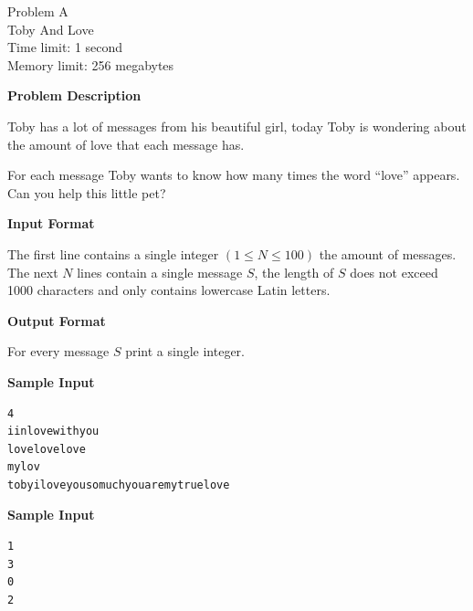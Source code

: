 \documentclass[11pt]{article}
\begin{document}
        \setcounter{page}{1}

        
        
        \begin{center}
            {\LARGE Problem A}\\
            {\Large Toby And Love}\\
            {Time limit: 1 second}\\
            {Memory limit: 256 megabytes}
        \end{center}\textbf{\large Problem Description}

Toby has a lot of messages from his beautiful girl, today Toby is wondering about
the amount of love that each message has.

For each message Toby wants to know how many times the word ``love'' appears.
Can you help this little pet?

\textbf{\large Input Format}

The first line contains a single integer $(1 \le N \le 100)$ the amount of messages.
The next $N$ lines contain a single message $S$, the length of $S$ does not exceed 1000 characters
and only contains lowercase Latin letters.

\textbf{\large Output Format}

For every message $S$ print a single integer.

\textbf{\large Sample Input}

\begin{verbatim}
4
iinlovewithyou
lovelovelove
mylov
tobyiloveyousomuchyouaremytruelove
\end{verbatim}

\textbf{\large Sample Input}

\begin{verbatim}
1
3
0
2
\end{verbatim}

\newpage

    
\end{document}
